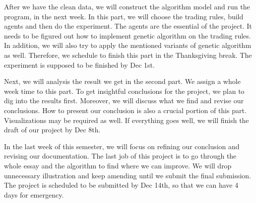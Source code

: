 \documentclass{article}
\begin{document}
After we have the clean data, we will construct the algorithm model and run the program, in the next week.
In this part, we will choose the trading rules, build agents and then do the experiment.
The agents are the essential of the project.
It needs to be figured out how to implement genetic algorithm on the trading rules.
In addition, we will also try to apply the mentioned variants of genetic algorithm as well.
Therefore, we schedule to finish this part in the Thanksgiving break.
The experiment is supposed to be finished by Dec 1st.

Next, we will analysis the result we get in the second part.
We assign a whole week time to this part.
To get insightful conclusions for the project, we plan to dig into the results first.
Moreover, we will discuss what we find and revise our conclusions.
How to present our conclusion is also a crucial portion of this part.
Visualizations may be required as well.
If everything goes well, we will finish the draft of our project by Dec 8th.

In the last week of this semester, we will focus on refining our conclusion and revising our documentation.
The last job of this project is to go through the whole essay and the algorithm to find where we can improve.
We will drop unnecessary illustration and keep amending until we submit the final submission.
The project is scheduled to be submitted by Dec 14th, so that we can have 4 days for emergency.





\end{document}
